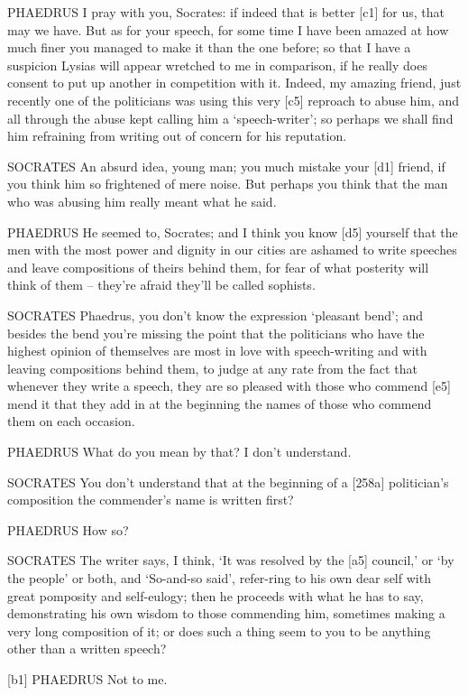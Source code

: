 PHAEDRUS I pray with you, Socrates: if indeed that is better {[}c1{]}
for us, that may we have. But as for your speech, for some time I have
been amazed at how much finer you managed to make it than the one
before; so that I have a suspicion Lysias will appear wretched to me in
comparison, if he really does consent to put up another in competition
with it. Indeed, my amazing friend, just recently one of the politicians
was using this very {[}c5{]} reproach to abuse him, and all through the
abuse kept calling him a ‘speech-writer'; so perhaps we shall find him
refraining from writing out of concern for his reputation.

SOCRATES An absurd idea, young man; you much mistake your {[}d1{]}
friend, if you think him so frightened of mere noise. But perhaps you
think that the man who was abusing him really meant what he said.

PHAEDRUS He seemed to, Socrates; and I think you know {[}d5{]} yourself
that the men with the most power and dignity in our cities are ashamed
to write speeches and leave compositions of theirs behind them, for fear
of what posterity will think of them -- they're afraid they'll be called
sophists.

SOCRATES Phaedrus, you don't know the expression ‘pleasant
bend'; and besides the
bend you're missing the point that the politicians who have the highest
opinion of themselves are most in love with speech-writing and with
leaving compositions behind them, to judge at any rate from the fact
that whenever they write a speech, they are so pleased with those who
commend {[}e5{]} mend it that they add in at the beginning the names of
those who commend them on each occasion.

PHAEDRUS What do you mean by that? I don't understand.

SOCRATES You don't understand that at the beginning of a {[}258a{]}
politician's composition the commender's name is written first?

PHAEDRUS How so?

SOCRATES The writer says, I think, ‘It was resolved by the {[}a5{]}
council,' or ‘by the people' or both, and ‘So-and-so said', refer-ring
to his own dear self with great pomposity and self-eulogy; then he
proceeds with what he has to say, demonstrating his own wisdom to those
commending him, sometimes making a very long composition of it; or does
such a thing seem to you to be anything other than a written speech?

{[}b1{]} PHAEDRUS Not to me.

